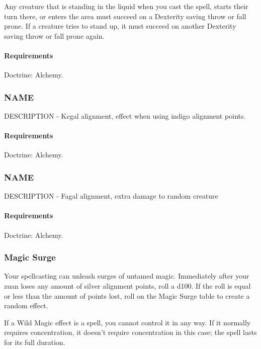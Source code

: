     Any creature that is standing in the liquid when you cast the spell, starts their turn there, or enters the area must succeed on a Dexterity saving throw or fall prone.
    If a creature tries to stand up, it must succeed on another Dexterity saving throw or fall prone again.
    \paragraph{Requirements} Doctrine: Alchemy.
\subsubsection{NAME} \label{feat::name}
    DESCRIPTION - Kegal alignment, effect when using indigo alignment points.
    \paragraph{Requirements} Doctrine: Alchemy.
\subsubsection{NAME} \label{feat::name}
    DESCRIPTION - Fagal alignment, extra damage to random creature
    \paragraph{Requirements} Doctrine: Alchemy.
\subsubsection{Magic Surge} \label{feat::magicsurge}
    Your spellcasting can unleash surges of untamed magic.
    Immediately after your zuan loses any amount of silver alignment points, roll a d100.
    If the roll is equal or less than the amount of points lost, roll on the Magic Surge table to create a random effect.

    If a Wild Magic effect is a spell, you cannot control it in any way.
    If it normally requires concentration, it doesn't require concentration in this case; the spell lasts for its full duration.

